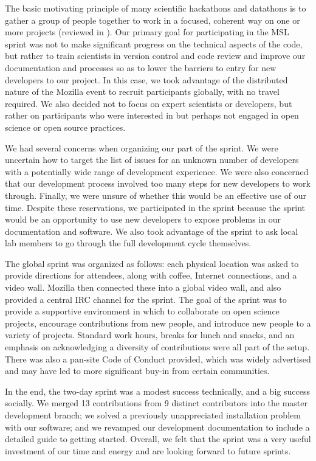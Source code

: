 \documentclass[11pt]{article}
\begin{document}
The basic motivating principle of many scientific hackathons and
datathons is to gather a group of people together to work in a
focused, coherent way on one or more projects (reviewed in
\cite{Trainer:2014:CCE:2660398.2660420}).  Our primary goal for
participating in the MSL sprint was not to make significant progress
on the technical aspects of the code, but rather to train scientists
in version control and code review and improve our documentation and
processes so as to lower the barriers to entry for new developers to
our project.  In this case, we took advantage of the distributed
nature of the Mozilla event to recruit participants globally, with no
travel required.  We also decided not to focus on expert scientists or
developers, but rather on participants who were interested in but
perhaps not engaged in open science or open source practices.

We had several concerns when organizing our part of the sprint.  We
were uncertain how to target the list of issues for an unknown number
of developers with a potentially wide range of development experience.
We were also concerned that our development process involved too many
steps for new developers to work through.  Finally, we were unsure of
whether this would be an effective use of our time.  Despite these
reservations, we participated in the sprint because the sprint would
be an opportunity to use new developers to expose problems in our
documentation and software.  We also took advantage of the sprint to
ask local lab members to go through the full development cycle
themselves.

The global sprint was organized as follows: each physical location was
asked to provide directions for attendees, along with coffee, Internet
connections, and a video wall.  Mozilla then connected these into a
global video wall, and also provided a central IRC channel for the
sprint.  The goal of the sprint was to provide a supportive
environment in which to collaborate on open science projects,
encourage contributions from new people, and introduce new people to a
variety of projects.  Standard work hours, breaks for lunch and
snacks, and an emphasis on acknowledging a diversity of contributions
were all part of the setup.  There was also a pan-site Code of Conduct
provided, which was widely advertised and may have led to more
significant buy-in from certain communities.

In the end, the two-day sprint was a modest success technically, and a
big success socially. We merged 13 contributions from 9 distinct
contributors into the master development branch; we solved a
previously unappreciated installation problem with our software; and
we revamped our development documentation to include a detailed guide
to getting started.  Overall, we felt that the sprint was a very
useful investment of our time and energy and are looking forward to
future sprints.
\end{document}
